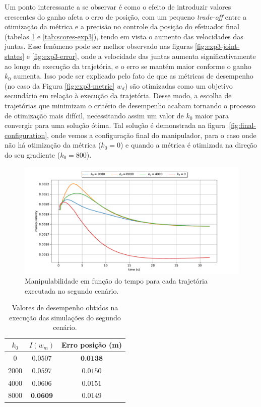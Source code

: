 Um ponto interessante a se observar é como o efeito de introduzir valores crescentes do ganho afeta o erro de posição, 
com um pequeno \emph{trade-off} entre a otimização da métrica e a precisão no controle da posição 
do efetuador final (tabelas \ref*{tab:scores-exp2} e \ref*{tab:scores-exp3}), tendo em vista o aumento das 
velocidades das juntas. Esse fenômeno pode ser melhor observado nas figuras \ref*{fig:exp3-joint-states} e 
\ref*{fig:exp3-error}, onde a velocidade das juntas aumenta significativamente ao longo da execução da trajetória, 
e o erro se mantém maior conforme o ganho \(k_0\) aumenta. Isso pode ser explicado pelo fato 
de que as métricas de desempenho (no caso da Figura \ref*{fig:exp3-metric} \(w_d\)) são otimizadas como 
um objetivo secundário em relação à execução da trajetória. Desse modo, a escolha de trajetórias que minimizam 
o critério de desempenho acabam tornando o processo de otimização mais difícil, necessitando assim um valor 
de \(k_0\) maior para convergir para uma solução ótima. Tal solução é demonstrada na 
figura~\ref{fig:final-configuration}, onde vemos a configuração final do manipulador, para o caso onde não há otimização 
da métrica (\(k_0=0\)) e quando a métrica é otimizada na direção do seu gradiente (\(k_0=800\)).

\begin{figure}
	\centering
	\includegraphics[width=\textwidth]{./Images/2024-06-11-09-17-48/metric_manipulability.pdf}
	\caption{Manipulabilidade em função do tempo para cada trajetória executada no segundo cenário.}\label{fig:exp2-metric}
\end{figure}

\begin{table}[htbp]
    \centering
    \begin{tabular}{ccc}
        \toprule
        \( k_0 \) & \( I(w_m) \)  & Erro posição (m) \\
        \midrule
        0  & \( 0.0507 \) & \( \textbf{0.0138} \) \\
        2000  & \( 0.0597 \) & \( 0.0150 \) \\
        4000  & \( 0.0606 \) & \( 0.0151 \) \\
        8000  & \( \textbf{0.0609} \) & \( 0.0149 \) \\
        \bottomrule
    \end{tabular}
    \caption{Valores de desempenho obtidos na execução das simulações do segundo cenário.}
    \label{tab:scores-exp2}
\end{table}

